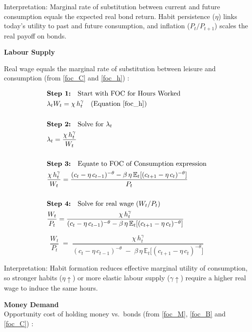 \documentclass[11pt,preprint]{elsarticle}
\numberwithin{equation}{section}
\numberwithin{figure}{section}
\numberwithin{table}{section}
\begin{document}
Interpretation: Marginal rate of substitution between current and future
consumption equals the expected real bond return. Habit persistence
(\(\eta\)) links today's utility to past and future consumption, and
inflation (\(P_t/P_{t+1}\)) scales the real payoff on bonds.

\textbf{Labour Supply}

Real wage equals the marginal rate of substitution between leisure and
consumption (from \eqref{foc_C} and \eqref{foc_h}) :

\begin{align*}
& \textbf{Step 1:} \quad \text{Start with FOC for Hours Worked} \\
& \lambda_t W_t = \chi\,h_t^{\gamma} \quad \text{(Equation \ref{foc_h})} \\
& \\
& \textbf{Step 2:} \quad \text{Solve for } \lambda_t \\
& \lambda_t = \frac{\chi\,h_t^{\gamma}}{W_t} \\
& \\
& \textbf{Step 3:} \quad \text{Equate to FOC of Consumption expression} \\
& \frac{\chi\,h_t^{\gamma}}{W_t} = \frac{(c_t - \eta\,c_{t-1})^{-\theta} - \beta\,\eta\,\mathbb{E}_t[(c_{t+1} - \eta\,c_t)^{-\theta}]}{P_t} \\
& \\
& \textbf{Step 4:} \quad \text{Solve for real wage } (W_t/P_t) \\
& \frac{W_t}{P_t} = \frac{\chi\,h_t^{\gamma}}{(c_t - \eta\,c_{t-1})^{-\theta} - \beta\,\eta\,\mathbb{E}_t[(c_{t+1} - \eta\,c_t)^{-\theta}]}
\end{align*}

\begin{equation}\label{labourSupply_app}
\boxed{
  \frac{W_t}{P_t}
  \;=\;
  \frac{\chi\,h_t^{\gamma}}
       {(c_t - \eta\,c_{t-1})^{-\theta}
        \;-\;
        \beta\,\eta\,\mathbb{E}_t\!\bigl[(c_{t+1} - \eta\,c_t)^{-\theta}\bigr]}
}
\end{equation}

Interpretation: Habit formation reduces effective marginal utility of
consumption, so stronger habits (\(\eta\uparrow\)) or more elastic
labour supply (\(\gamma\uparrow\)) require a higher real wage to induce
the same hours.

\textbf{Money Demand}\\
Opportunity cost of holding money vs.~bonds (from \eqref{foc_M},
\eqref{foc_B} and \eqref{foc_C}) :
\end{document}
